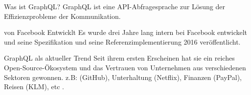 \begin{frame}{}

    \footnotesize

    \begin{block}{Was ist GraphQL?}
        GraphQL ist eine API-Abfragesprache zur Lösung der Effizienzprobleme der Kommunikation\cite{gql-iot}.         
    \end{block}

    \begin{block}{von Facebook Entwicklt}
        Es wurde drei Jahre lang intern bei Facebook entwickelt und seine Spezifikation und seine Referenzimplementierung 2016 veröffentlicht.
        \cite{initial-analysis-of-gql}
    \end{block}

    \begin{block}{GraphQL als aktueller Trend}
        Seit ihrem ersten Erscheinen hat sie ein reiches Open-Source-Ökosystem und das Vertrauen von Unternehmen aus verschiedenen Sektoren gewonnen. z.B: (GitHub), Unterhaltung (Netflix), Finanzen (PayPal), Reisen (KLM), etc \cite{morph-gql-1,gql-healthcare}.
    \end{block}

\end{frame}


